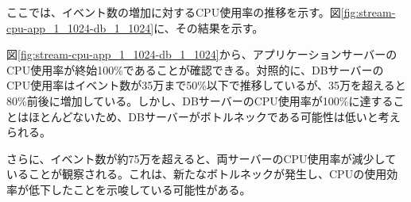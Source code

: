 \documentclass[../../../../../../main]{subfiles}
\begin{document}
    \label{subsubsubsec:result-streaming-only-limit-cpu}

    ここでは、イベント数の増加に対するCPU使用率の推移を示す。図\ref{fig:stream-cpu-app_1_1024-db_1_1024}に、その結果を示す。

    

    図\ref{fig:stream-cpu-app_1_1024-db_1_1024}から、アプリケーションサーバーのCPU使用率が終始100\%であることが確認できる。対照的に、DBサーバーのCPU使用率はイベント数が35万まで50\%以下で推移しているが、35万を超えると80\%前後に増加している。しかし、DBサーバーのCPU使用率が100\%に達することはほとんどないため、DBサーバーがボトルネックである可能性は低いと考えられる。

    さらに、イベント数が約75万を超えると、両サーバーのCPU使用率が減少していることが観察される。これは、新たなボトルネックが発生し、CPUの使用効率が低下したことを示唆している可能性がある。
\end{document}
